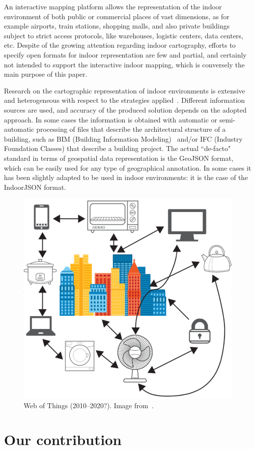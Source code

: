 \documentclass{sig-alternate}
\begin{document}
An interactive mapping platform allows the representation of the indoor environment of  both public or commercial places of vast dimensions, as for example airports, train stations, shopping malls, and also private buildings subject to strict access protocols, like warehouses, logistic centers, data centers, etc.
Despite of the growing attention regarding indoor cartography, efforts to specify open formats for indoor representation are few and partial, and certainly not intended to support the interactive indoor mapping, which is conversely the main purpose of this paper.

Research on the cartographic representation of indoor environments is extensive and heterogeneous with respect to the strategies applied~\cite{6418876}. Different information sources are used, and accuracy of the produced solution depends on the adopted approach. In some cases the information is obtained with automatic or semi-automatic processing of files that describe the architectural structure of a building, such as BIM (Building Information Modeling)~\cite{Eastman:2008:BHG:1796500} and/or IFC (Industry Foundation Classes) that describe a building project. 
The actual ``de-facto" standard in terms of geospatial data representation is the GeoJSON format, which can be easily used for any type of geographical annotation. In some cases it has been slightly adapted to be used in indoor environments: it is the case of the IndoorJSON format.

\begin{figure}[htbp]
\centering
\includegraphics[width=.6\linewidth]{../images/webOfThings}
\caption{Web of Things (2010--2020?).  Image from~\cite{webOfThings:2015}.}
\label{fig:pipeline}
\end{figure}


\section{Our contribution}
\end{document}
